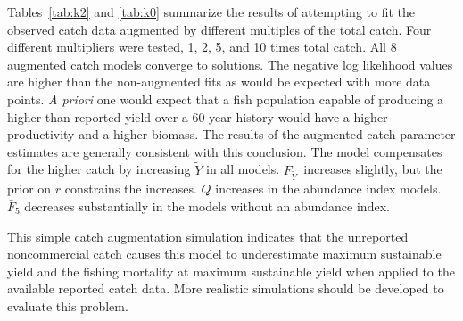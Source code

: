\documentclass[12pt,letterpaper]{article}
\newcommand\MSY{\widetilde{Y}}
\newcommand\Fmsy{F_{\MSY}}
\begin{document}
Tables~\ref{tab:k2} and \ref{tab:k0} summarize the results of
attempting to fit the observed catch data augmented by 
different multiples of the total catch. Four different multipliers
were tested, 1, 2, 5, and 10 times total catch.
All 8 augmented catch models converge to solutions. The negative
log likelihood values are higher than the non-augmented fits as would
be expected with more data points.
{\it A priori} one would expect that a fish population capable
of producing a higher than reported yield over a 60 year history
would have a higher productivity and a higher biomass. The results of
the augmented catch parameter estimates are generally consistent with
this conclusion. 
The model compensates for the higher catch by
increasing $\MSY$ in all models. $\Fmsy$\ increases slightly, but the
prior on $r$ constrains the increases. $Q$ increases in
the abundance index models. $\bar{F}_5$ decreases substantially in the
models without an abundance index.

This simple catch augmentation simulation indicates that the unreported
noncommercial catch causes this model to underestimate maximum
sustainable yield and the fishing mortality at maximum sustainable
yield when applied to the available reported catch data.
More realistic simulations should be developed to evaluate this
problem.
\end{document}
